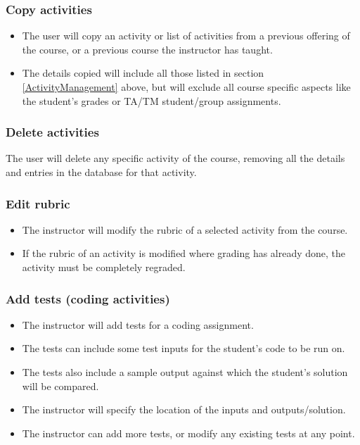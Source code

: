 \documentclass{article}
\begin{document}
\subsubsection{Copy activities \label{copyAct}}
\begin{itemize}
	\item The user will copy an activity or list of activities from a previous 
		offering of the course, or a previous course the instructor has taught.
	\item The details copied will include all those listed in section \ref{ActivityManagement}
		above, but will exclude all course specific aspects like the student's grades
		or TA/TM student/group assignments.
\end{itemize}
\subsubsection{Delete activities \label{deleteAct}}
The user will delete any specific activity of the course, removing all the details and entries
in the database for that activity.
\subsubsection{Edit rubric \label{editRubric}}
\begin{itemize}
	\item The instructor will modify the rubric of a selected activity from the course.
	\item If the rubric of an activity is modified where grading has already done, the 
		activity must be completely regraded.
\end{itemize}
\subsubsection{Add tests (coding activities) \label{addTests}}
\begin{itemize}
	\item The instructor will add tests for a coding assignment.
	\item The tests can include some test inputs for the student's code to be run on.
	\item The tests also include a sample output against which the student's solution
		will be compared.
	\item The instructor will specify the location of the inputs and outputs/solution.
	\item The instructor can add more tests, or modify any existing tests at any point.
\end{itemize}
\end{document}
